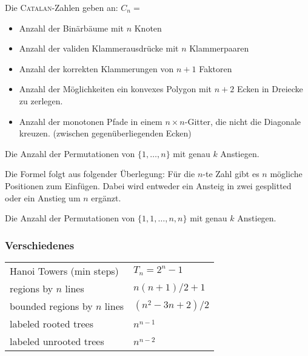 \begin{bem}\label{bem:catalanAnwendung}
Die \textsc{Catalan}-Zahlen geben an: $C_n =$
\begin{itemize}
	\item Anzahl der Binärbäume mit $n$ Knoten
	\item Anzahl der validen Klammerausdrücke mit $n$ Klammerpaaren
	\item Anzahl der korrekten Klammerungen von $n+1$ Faktoren
	\item Anzahl der Möglichkeiten ein konvexes Polygon mit $n+2$ Ecken in Dreiecke zu zerlegen.
	\item Anzahl der monotonen Pfade in einem $n \times n$-Gitter, die nicht die Diagonale kreuzen. (zwischen gegenüberliegenden Ecken)
\end{itemize}
\end{bem}

\begin{bem}\label{bem:euler1Intuition}
Die Anzahl der Permutationen von $\{1, \ldots, n\}$ mit genau $k$ Anstiegen.

Die Formel folgt aus folgender Überlegung: Für die $n$-te Zahl gibt es $n$ mögliche Positionen zum Einfügen. Dabei wird entweder ein Ansteig in zwei gesplitted oder ein Anstieg um $n$ ergänzt.
\end{bem}

\begin{bem}\label{bem:euler2Intuition}
Die Anzahl der Permutationen von $\{1,1, \ldots, n,n\}$ mit genau $k$ Anstiegen.
\end{bem}

\subsubsection{Verschiedenes}
\begin{tabular}{|l|l|}
	\hline
	Hanoi Towers (min steps)		& $T_n = 2^n - 1$\\
	regions by $n$ lines			& $n\left(n + 1\right) / 2 + 1$\\
	bounded regions by $n$ lines		& $\left(n^2 - 3n + 2\right) / 2$\\
	labeled rooted trees			& $n^{n-1}$\\
	labeled unrooted trees			& $n^{n-2}$\\
	\hline
\end{tabular}